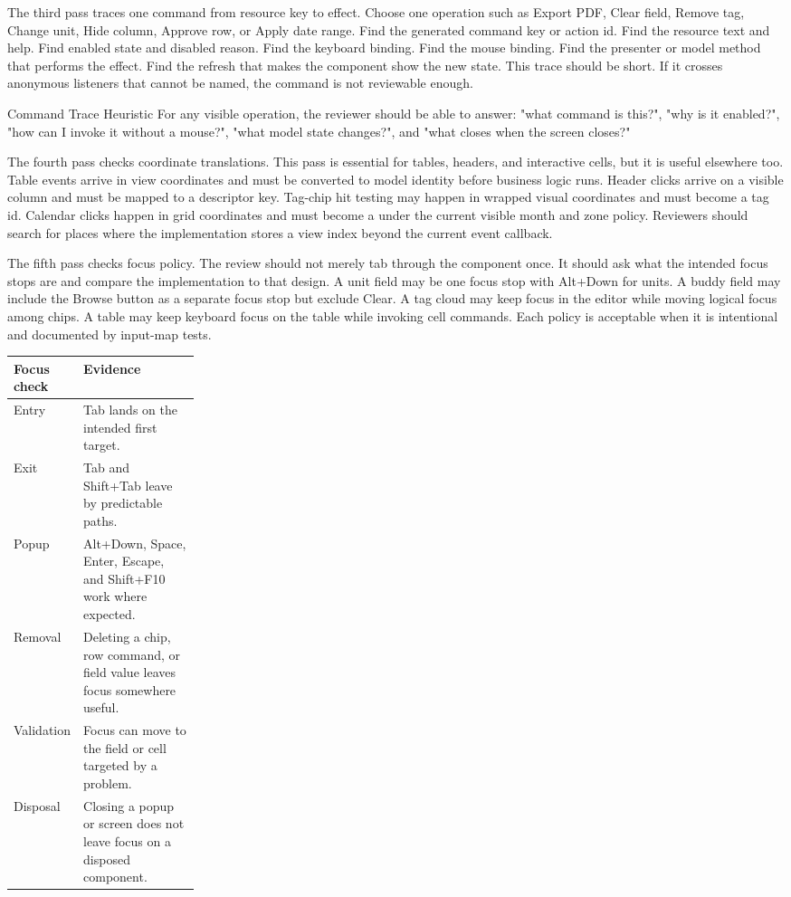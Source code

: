 The third pass traces one command from resource key to effect. Choose one
operation such as Export PDF, Clear field, Remove tag, Change unit, Hide column,
Approve row, or Apply date range. Find the generated command key or action id.
Find the resource text and help. Find enabled state and disabled reason. Find the
keyboard binding. Find the mouse binding. Find the presenter or model method
that performs the effect. Find the refresh that makes the component show the new
state. This trace should be short. If it crosses anonymous listeners that cannot
be named, the command is not reviewable enough.

\begin{detailbox}{Command Trace Heuristic}
For any visible operation, the reviewer should be able to answer: "what command
is this?", "why is it enabled?", "how can I invoke it without a mouse?", "what
model state changes?", and "what closes when the screen closes?"
\end{detailbox}

The fourth pass checks coordinate translations. This pass is essential for
tables, headers, and interactive cells, but it is useful elsewhere too. Table
events arrive in view coordinates and must be converted to model identity before
business logic runs. Header clicks arrive on a visible column and must be mapped
to a descriptor key. Tag-chip hit testing may happen in wrapped visual
coordinates and must become a tag id. Calendar clicks happen in grid coordinates
and must become a  under the current visible month and zone
policy. Reviewers should search for places where the implementation stores a
view index beyond the current event callback.

The fifth pass checks focus policy. The review should not merely tab through the
component once. It should ask what the intended focus stops are and compare the
implementation to that design. A unit field may be one focus stop with Alt+Down
for units. A buddy field may include the Browse button as a separate focus stop
but exclude Clear. A tag cloud may keep focus in the editor while moving logical
focus among chips. A table may keep keyboard focus on the table while invoking
cell commands. Each policy is acceptable when it is intentional and documented
by input-map tests.

\begin{tabularx}{0.96\linewidth}{@{}p{0.24\linewidth}X@{}}
\toprule
Focus check & Evidence\\
\midrule
Entry & Tab lands on the intended first target.\\
Exit & Tab and Shift+Tab leave by predictable paths.\\
Popup & Alt+Down, Space, Enter, Escape, and Shift+F10 work where expected.\\
Removal & Deleting a chip, row command, or field value leaves focus somewhere useful.\\
Validation & Focus can move to the field or cell targeted by a problem.\\
Disposal & Closing a popup or screen does not leave focus on a disposed component.\\
\bottomrule
\end{tabularx}

